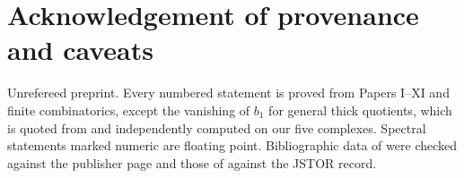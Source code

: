 \section*{Acknowledgement of provenance and caveats}

Unrefereed preprint. Every numbered statement is proved from Papers I--XI and finite
combinatorics, except the vanishing of $b_1$ for general thick quotients, which is quoted
from \cite{Ga,BSw} and independently computed on our five complexes. Spectral statements
marked numeric are floating point. Bibliographic data of \cite{BSw} were checked against
the publisher page and those of \cite{Ga} against the JSTOR record.
